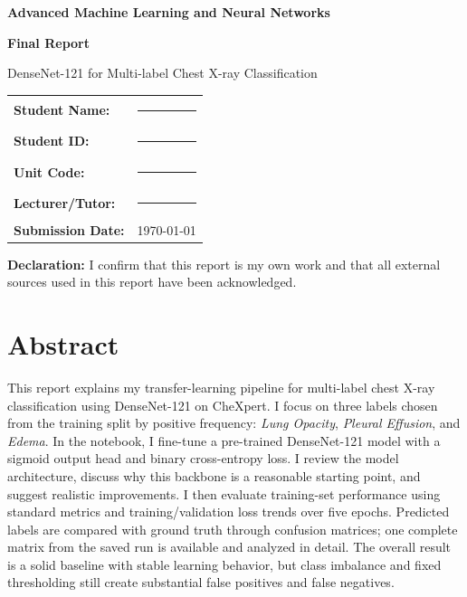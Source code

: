 \documentclass[12pt]{article}
\begin{document}
\begin{titlepage}
    \centering
    \vspace*{2cm}
    {\Large \textbf{Advanced Machine Learning and Neural Networks}\par}
    \vspace{1.2cm}
    {\huge \textbf{Final Report}\par}
    \vspace{0.5cm}
    {\Large DenseNet-121 for Multi-label Chest X-ray Classification\par}
    \vspace{2cm}

    \begin{tabular}{>{\bfseries}p{4cm}p{9cm}}
        Student Name: & \rule{8cm}{0.4pt} \\
        Student ID: & \rule{8cm}{0.4pt} \\
        Unit Code: & \rule{8cm}{0.4pt} \\
        Lecturer/Tutor: & \rule{8cm}{0.4pt} \\
        Submission Date: & \today \\
    \end{tabular}

    \vfill
    \begin{minipage}{0.9\textwidth}
        \small
        \textbf{Declaration:} I confirm that this report is my own work and that all external sources used in this report have been acknowledged.
    \end{minipage}
\end{titlepage}

\onehalfspacing

\section*{Abstract}
This report explains my transfer-learning pipeline for multi-label chest X-ray classification using DenseNet-121 on CheXpert. I focus on three labels chosen from the training split by positive frequency: \textit{Lung Opacity}, \textit{Pleural Effusion}, and \textit{Edema}. In the notebook, I fine-tune a pre-trained DenseNet-121 model with a sigmoid output head and binary cross-entropy loss. I review the model architecture, discuss why this backbone is a reasonable starting point, and suggest realistic improvements. I then evaluate training-set performance using standard metrics and training/validation loss trends over five epochs. Predicted labels are compared with ground truth through confusion matrices; one complete matrix from the saved run is available and analyzed in detail. The overall result is a solid baseline with stable learning behavior, but class imbalance and fixed thresholding still create substantial false positives and false negatives.
\end{document}
